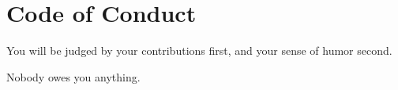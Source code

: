 \chapter{Code of Conduct }
\hypertarget{md__c_o_d_e___o_f___c_o_n_d_u_c_t}{}\label{md__c_o_d_e___o_f___c_o_n_d_u_c_t}
\label{md__c_o_d_e___o_f___c_o_n_d_u_c_t_autotoc_md6}%
%



\begin{DoxyItemize}
\item You will be judged by your contributions first, and your sense of humor second.
\item Nobody owes you anything. 
\end{DoxyItemize}